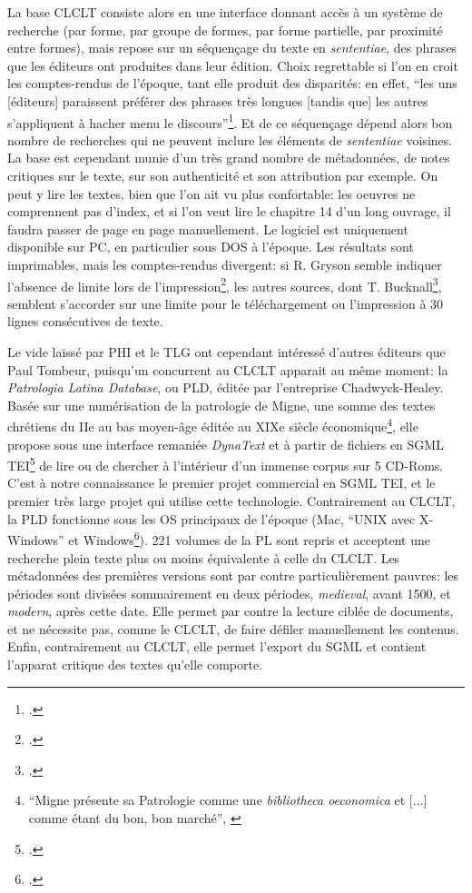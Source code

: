 La base CLCLT consiste alors en une interface donnant accès à un système de recherche (par forme, par groupe de formes, par forme partielle, par proximité entre formes), mais repose sur un séquençage du texte en \textit{sententiae}, des phrases que les éditeurs ont produites dans leur édition. Choix regrettable si l'on en croit les comptes-rendus de l'époque, tant elle produit des disparités: en effet, \enquote{les uns {[éditeurs]} paraissent préférer des phrases très longues {[tandis que]} les autres s'appliquent à hacher menu le discours}\footcite{gryson_nouvelle_1992}. Et de ce séquençage dépend alors bon nombre de recherches qui ne peuvent inclure les éléments de \textit{sententiae} voisines. La base est cependant munie d'un très grand nombre de métadonnées, de notes critiques sur le texte, sur son authenticité et son attribution par exemple. On peut y lire les textes, bien que l'on ait vu plus confortable: les oeuvres ne comprennent pas d'index, et si l'on veut lire le chapitre 14 d'un long ouvrage, il faudra passer de page en page manuellement. Le logiciel est uniquement disponible sur PC, en particulier sous DOS à l'époque. Les résultats sont imprimables, mais les comptes-rendus divergent: si R. Gryson semble indiquer l'absence de limite lors de l'impression\footcite[p. 421]{gryson_nouvelle_1992}, les autres sources, dont T. Bucknall\footcite[p. 94]{bucknall_review_1994}, semblent s'accorder sur une limite pour le téléchargement ou l'impression à 30 lignes consécutives de texte.

Le vide laissé par PHI et le TLG ont cependant intéressé d'autres éditeurs que Paul Tombeur, puisqu'un concurrent au CLCLT apparait au même moment: la \textit{Patrologia Latina Database}, ou PLD, éditée par l'entreprise Chadwyck-Healey. Basée sur une numérisation de la patrologie de Migne, une somme des textes chrétiens du IIe au bas moyen-âge éditée au XIXe siècle économique\footnote{\enquote{Migne présente sa Patrologie comme une \textit{bibliotheca oeconomica} et {[...]} comme étant du bon, bon marché}, \cite[p. 228]{tombeur_pld_1993}}, elle propose sous une interface remaniée \textit{DynaText} et à partir de fichiers en SGML TEI\footcite{smith_dynatext_1993} de lire ou de chercher à l'intérieur d'un immense corpus sur 5 CD-Roms. C'est à notre connaissance le premier projet commercial en SGML TEI, et le premier très large projet qui utilise cette technologie. Contrairement au CLCLT, la PLD fonctionne sous les OS principaux de l'époque (Mac, \enquote{UNIX avec X-Windows} et Windows\footcite{smith_dynatext_1993}). 221 volumes de la PL sont repris et acceptent une recherche plein texte plus ou moins équivalente à celle du CLCLT. Les métadonnées des premières versions sont par contre particulièrement pauvres: les périodes sont divisées sommairement en deux périodes, \textit{medieval}, avant 1500, et \textit{modern}, après cette date. Elle permet par contre la lecture ciblée de documents, et ne nécessite pas, comme le CLCLT, de faire défiler manuellement les contenus. Enfin, contrairement au CLCLT, elle permet l'export du SGML et contient l'apparat critique des textes qu'elle comporte.


